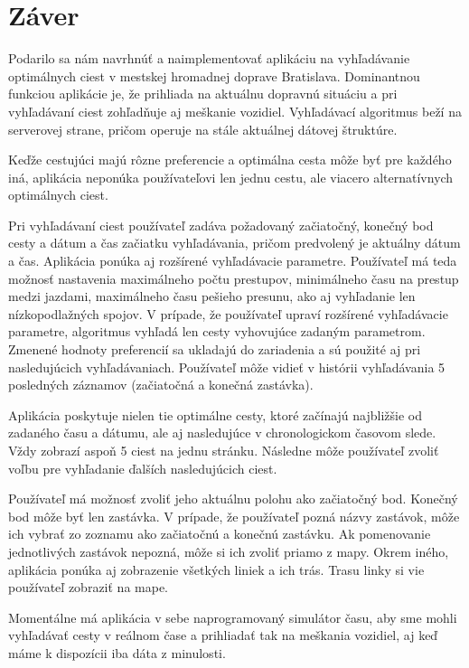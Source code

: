 \chapter*{Záver}  %

Podarilo sa nám navrhnúť a naimplementovať aplikáciu na vyhľadávanie optimálnych ciest v mestskej hromadnej doprave Bratislava. Dominantnou funkciou aplikácie je, že prihliada na aktuálnu dopravnú situáciu a pri vyhľadávaní ciest zohľadňuje aj meškanie vozidiel. Vyhľadávací algoritmus beží na serverovej strane, pričom operuje na stále aktuálnej dátovej štruktúre. 

Keďže cestujúci majú rôzne preferencie a optimálna cesta môže byť pre každého iná, aplikácia neponúka používateľovi len jednu cestu, ale viacero alternatívnych optimálnych ciest. 

Pri vyhľadávaní ciest používateľ zadáva požadovaný začiatočný, konečný bod cesty a dátum a čas začiatku vyhľadávania, pričom predvolený je aktuálny dátum a čas. Aplikácia ponúka aj rozšírené vyhľadávacie parametre. Používateľ má teda možnosť nastavenia maximálneho počtu prestupov, minimálneho času na prestup medzi jazdami, maximálneho času pešieho presunu, ako aj vyhľadanie len nízkopodlažných spojov. V prípade, že používateľ upraví rozšírené vyhľadávacie parametre, algoritmus vyhľadá len cesty vyhovujúce zadaným parametrom. Zmenené hodnoty preferencií sa ukladajú do zariadenia a sú použité aj pri nasledujúcich vyhľadávaniach. Používateľ môže vidieť v histórii vyhľadávania 5 posledných záznamov (začiatočná a konečná zastávka). 

Aplikácia poskytuje nielen tie optimálne cesty, ktoré začínajú najbližšie od zadaného času a dátumu, ale aj nasledujúce v chronologickom časovom slede. Vždy zobrazí aspoň 5 ciest na jednu stránku. Následne môže používateľ zvoliť voľbu pre vyhľadanie ďalších nasledujúcich ciest.

Používateľ má možnosť zvoliť jeho aktuálnu polohu ako začiatočný bod. Konečný bod môže byť len zastávka. V prípade, že používateľ pozná názvy zastávok, môže ich vybrať zo zoznamu ako začiatočnú a konečnú zastávku. Ak pomenovanie jednotlivých zastávok nepozná, môže si ich zvoliť priamo z mapy. Okrem iného, aplikácia ponúka aj zobrazenie všetkých liniek a ich trás. Trasu linky si vie používateľ zobraziť na mape. 

Momentálne má aplikácia v sebe naprogramovaný simulátor času, aby sme mohli vyhľadávať cesty v reálnom čase a prihliadať tak na meškania vozidiel, aj keď máme k dispozícii iba dáta z minulosti. 

